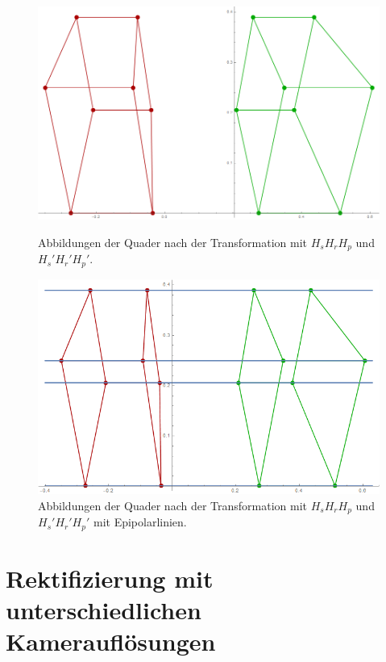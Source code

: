 \begin{figure}[!htb]
	\includegraphics[width=\linewidth]{images/Rectification_HsHrHp_same_Solutions.png}
	\caption[Transformationen $H_sH_rH_p$ und $H_s'H_r'H_p'$ ]{Abbildungen der Quader nach der Transformation mit $H_sH_rH_p$ und $H_s'H_r'H_p'$.}
	\label{fig:RectSameHsHrHp1}
	\endminipage\hfill
	\includegraphics[width=\linewidth]{images/Rectification_HsHrHp_same_Solutions_Lines.png}
	\caption[Tranformationen $H_sH_rH_p$ und $H_s'H_r'H_p'$ mit Epipolarlinien]{Abbildungen der Quader nach der Transformation mit $H_sH_rH_p$ und $H_s'H_r'H_p'$ mit Epipolarlinien.}
	\label{fig:RectSameHsHrHp2}
	\endminipage\hfill
\end{figure}

\section{Rektifizierung mit unterschiedlichen Kamerauflösungen}


